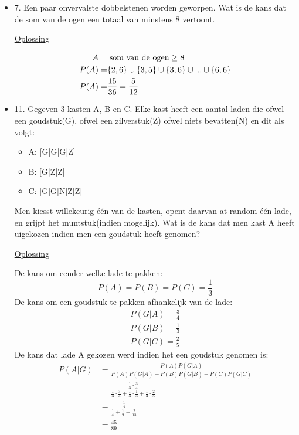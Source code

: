 \documentclass[12pt]{report}
\newcommand{\exercise}[2]{
  #1
  

  \underline{Oplossing}
  
  #2
  
    \hrulefill
}
\begin{document}
\begin{itemize}[label={}, leftmargin=*]
	      
	      
	\item{\exercise{7. Een paar onvervalste dobbelstenen worden geworpen. Wat is de kans dat de som van de ogen een totaal van minstens 8 vertoont.}{
	      \begin{equation*}
	      	\begin{split}
	      		A =  &\;\hbox{som van de ogen} \geq 8\\
	      		P(A) =  &\{2, 6\} \cup \{3, 5\} \cup \{3, 6\} \cup ... \cup \{6,6\} \\
	      		P(A) = & \frac{15}{36} = \frac{5}{12}
	      	\end{split}
	      \end{equation*}}}
	      
	\item{\exercise{11. Gegeven 3 kasten A, B en C. Elke kast heeft een aantal laden die ofwel een goudstuk(G), ofwel een zilverstuk(Z) ofwel niets bevatten(N) en dit als volgt:
	\begin{itemize}[label={}]
	 \item A: [G|G|G|Z]
	 \item B: [G|Z|Z]
	 \item C: [G|G|N|Z|Z]
	\end{itemize}
	Men kiesst willekeurig één van de kasten, opent daarvan at random één lade, en grijpt het muntstuk(indien mogelijk). Wat is de kans dat men kast A heeft uigekozen indien men een goudstuk heeft genomen?
	}{
	De kans om eender welke lade te pakken:
	$$P(A) = P(B) = P(C) = \frac{1}{3}$$
	De kans om een goudstuk te pakken afhankelijk van de lade:
	\begin{gather*}
	 P(G|A) = \frac{3}{4}\\
	 P(G|B) = \frac{1}{3}\\
	 P(G|C) = \frac{2}{5}
	\end{gather*}
	De kans dat lade A gekozen werd indien het een goudstuk genomen is:
	\begin{equation*}
	 \begin{split}
	  P(A|G) & = \frac{P(A)P(G|A)}{P(A)P(G|A)+P(B)P(G|B)+P(C)P(G|C)} \\
	         & = \frac{\frac{1}{3}\cdot\frac{3}{4}}{\frac{1}{3}\cdot\frac{3}{4}+\frac{1}{3}\cdot\frac{1}{3}+\frac{1}{3}\cdot\frac{2}{5}} \\
	         & = \frac{\frac{1}{4}}{\frac{1}{4} + \frac{1}{9} + \frac{2}{15}} \\
	         & = \frac{45}{89}
	 \end{split}
	\end{equation*}

}}
\end{itemize}
\end{document}
